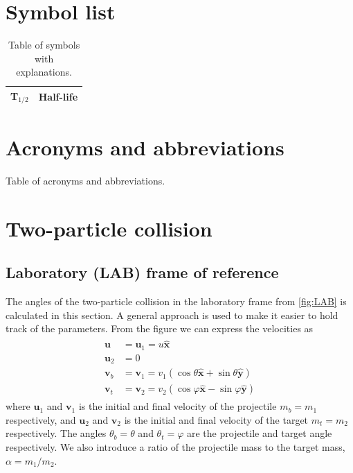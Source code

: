 \documentclass[twoside,english]{uiofysmaster/uiofysmaster}
\begin{document}
\begin{appendices}

\chapter{Symbol list}

\begin{table}[h]
  \centering
  \caption{Table of symbols with explanations.}
    \begin{tabular}{ll}
        \hline
        T$_{1/2}$ & Half-life \\
        \hline
    \end{tabular}
    \label{tab:symbols}
\end{table}


\chapter{Acronyms and abbreviations}

\begin{table}[ht] 
	\centering 
	\caption{Table of acronyms and abbreviations.}
	
\end{table}


\chapter{Two-particle collision}
\section{Laboratory (LAB) frame of reference}\label{sec:LAB}
The angles of the two-particle collision in the laboratory frame from \autoref{fig:LAB} is calculated in this section. A general approach is used to make it easier to hold track of the parameters. From the figure we can express the velocities as
\begin{align}\label{eq:2p-LAB-collision}
\begin{split}
	 \boldsymbol{u} &= \boldsymbol{u}_1 = u \boldsymbol{\hat{x}}  \\
	 \boldsymbol{u}_2 &= 0  \\
	 \boldsymbol{v}_b &= \boldsymbol{v}_1 = v_1 (\cos \theta \boldsymbol{\hat{x}} + \sin \theta \boldsymbol{\hat{y}})  \\
	\boldsymbol{v}_t &= \boldsymbol{v}_2 = v_2 (\cos \varphi \boldsymbol{\hat{x}} - \sin \varphi \boldsymbol{\hat{y}})
\end{split}
\end{align}
where $\boldsymbol{u}_1$ and $\boldsymbol{v}_1$ is the initial and final velocity of the projectile $m_b = m_1$ respectively, and $\boldsymbol{u}_2$ and $\boldsymbol{v}_2$ is the initial and final velocity of the target $m_t = m_2$ respectively. The angles $\theta_b = \theta$ and $\theta_t = \varphi$ are the projectile and target angle respectively. We also introduce a ratio of the projectile mass to the target mass, $\alpha = m_1/m_2$.


\end{appendices}
\end{document}
